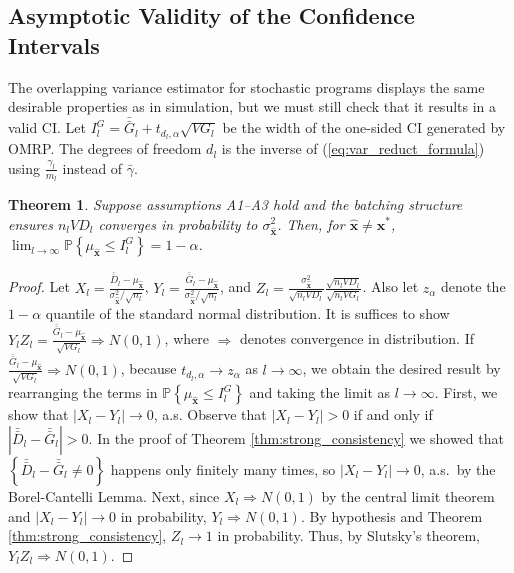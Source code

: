 \documentclass[12pt]{article}
\newtheorem{theorem}{Theorem}
\newcommand{\p}[1]{\mathbb{P} \left\{ #1 \right\}}
\newcommand{\x}{\mathbf{x}}
\newcommand{\xh}{{\hat{\x}}}
\newcommand{\xs}{\x^*}
\newcommand{\gammab}{\bar{\gamma}}
\newcommand{\gb}{\bar{G}}
\newcommand{\gbb}{\bar{\gb}}
\newcommand{\db}{\bar{D}}
\newcommand{\dbb}{\bar{\db}}
\begin{document}

\subsection{Asymptotic Validity of the Confidence Intervals}
\label{ssec:validity}

The overlapping variance estimator for stochastic programs displays the same desirable properties as in simulation, but we must still check that it results in a valid CI.  
Let $I^G_l = \gbb_l + t_{d_l,\alpha} \sqrt{VG_l}$ be the width of the one-sided CI generated by OMRP. 
The degrees of freedom $d_l$ is the inverse of (\ref{eq:var_reduct_formula}) using $\frac{\gamma_l}{m_l}$ instead of $\gammab$.

\begin{theorem} \label{thm:conf_int}
	Suppose assumptions A1--A3 hold and the batching structure ensures $n_l VD_l$ converges in probability to $\sigma^2_\xh$.  
        Then, for $\xh \neq \xs$, $\lim_{l\rightarrow\infty} \p{\mu_\xh \leq I^G_l} = 1 - \alpha$.
\end{theorem}

\begin{proof} 
			Let $X_l = \frac{\dbb_l - \mu_\xh}{\sigma^2_\xh/\sqrt{n_l}}$, $Y_l = \frac{\gbb_l - \mu_\xh}{\sigma^2_\xh/\sqrt{n_l}}$, and $Z_l = \frac{\sigma^2_\xh}{\sqrt{n_lVD_l}} \frac{\sqrt{n_lVD_l}}{\sqrt{n_lVG_l}}$. 
			Also let $z_{\alpha}$ denote the $1-\alpha$ quantile of the standard normal distribution. 
        It is suffices to show $Y_lZ_l = \frac{\gbb_l - \mu_\xh}{\sqrt{VG_l}} \Rightarrow N(0,1)$, where $\Rightarrow$ denotes convergence in distribution.
			If $\frac{\gbb_l - \mu_\xh}{\sqrt{VG_l}} \Rightarrow N(0,1)$, because $t_{d_l,\alpha} \rightarrow z_{\alpha}$ as $l \rightarrow \infty$, we obtain the desired result by rearranging the terms in $\p{\mu_\xh \leq I^G_l}$ and taking the limit as $l \rightarrow \infty$.
        First, we show that $|X_l - Y_l| \rightarrow 0$, a.s.  
		  Observe that $|X_l - Y_l| > 0$ if and only if $|\dbb_l - \gbb_l| > 0$.  
        In the proof of Theorem \ref{thm:strong_consistency} we showed that $\left\{ \dbb_l - \gbb_l \neq 0 \right\}$ happens only finitely many times, so $|X_l - Y_l| \rightarrow 0$, a.s.\ by the Borel-Cantelli Lemma. 
        Next, since $X_l \Rightarrow N(0,1)$  by the central limit theorem and $|X_l - Y_l| \rightarrow 0$ in probability, $Y_l \Rightarrow N(0,1)$.  
        By hypothesis and Theorem \ref{thm:strong_consistency}, $Z_l \rightarrow 1$ in probability.  
        Thus, by Slutsky's theorem, $Y_lZ_l \Rightarrow N(0,1)$.
\end{proof}
\end{document}
